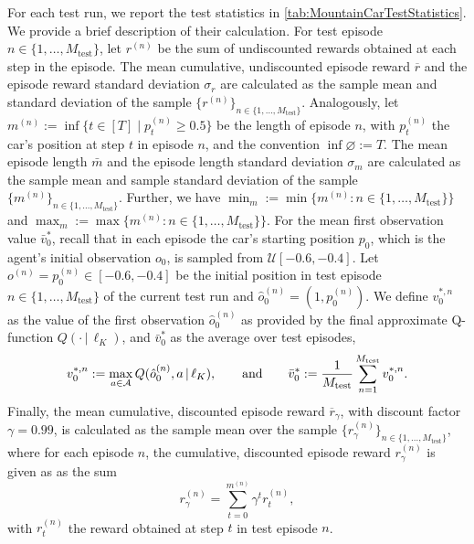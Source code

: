 \documentclass[
    a4paper,
    11pt,
    bibliography=totoc,
    listof=totoc,      
    headinclude=true,
    cleardoublepage=empty,
]{scrbook}
\theoremstyle{plain}
\theoremstyle{definition}
\theoremstyle{remark}
\newcommand{\SpaceA}{{\cal A}}
\begin{document}
For each test run, we report the test statistics in
\cref{tab:MountainCarTestStatistics}. We provide a brief description of their 
calculation. For test episode $n\in\{1,\dots,M_\text{test}\}$,
let $r^{(n)}$ be the sum of undiscounted rewards obtained at
each step in the episode. The mean cumulative, undiscounted episode reward 
$\overline{r}$ and the episode reward standard deviation $\sigma_r$ are calculated
as the sample mean and standard deviation of the sample $\{r^{(n)}\}_{n\in
\{1,\dots,M_\text{test}\}}$. Analogously, let $m^{(n)}:=\inf\{t\in[T]\mid p^{(n)}_{t} 
\geq 0.5\}$ be the length of episode $n$, with $p_t^{(n)}$ the car's position
at step $t$ in episode $n$, and the convention $\inf \varnothing := T$. The 
mean episode length $\bar{m}$ and the episode length standard deviation 
$\sigma_m$ are calculated as the sample mean and sample standard deviation of
the sample $\{m^{(n)}\}_{ n\in\{1,\dots,M_\text{test}\}}$. Further, we have 
$\min_m := \min\{m^{(n)} : n\in\{1,\dots,M_\text{test}\}\}$ and $\max_m := 
\max\{m^{(n)}: n\in\{1,\dots,M_\text{test}\}\}$. For the mean first observation 
value $\bar v^*_0$, recall that in each episode the car's starting position $p_0$,
which is the agent's initial observation $o_0$, is sampled from $\mathcal{U}
[-0.6, -0.4]$. Let $o^{(n)} = p_0^{(n)} \in [-0.6, -0.4]$ be the initial 
position in test episode $n\in\{1,\dots,M_\text{test}\}$ of the current test 
run and $\hat{o}^{(n)}_0 = (1,p^{(n)}_0)$. We define $v_0^{*,n}$ as the 
value of the first observation $\hat{o}^{(n)}_0$ as provided by the final 
approximate Q-function $Q(\cdot\,|\, \ell_K)$, and $\bar{v}_0^*$ as the 
average over test episodes,
\begin{equation}
\label{eq:MountainCarFirstObservationValue}
    v_0^{*,n} := \max_{a\in\SpaceA} Q(\hat{o}^{(n)}_0, a\,|\,\ell_K),
    \qquad \text{and} \qquad
    \bar v^*_0 := \frac{1}{M_\text{test}} \sum_{n=1}^{M_\text{test}} v_0^{*,n}.
\end{equation}
Finally, the mean cumulative, discounted episode reward $\overline{r}_\gamma$, 
with discount factor $\gamma=0.99$, is calculated as the sample mean over the 
sample $\{r_\gamma^{(n)}\}_{n\in\{1,\dots,M_\text{test}\}}$, 
where for each episode $n$, the cumulative, discounted episode reward 
$r_\gamma^{(n)}$ is given as as the sum
\begin{equation}
\label{eq:MountainCarDiscountedReward} 
    r_\gamma^{(n)} = \sum_{t=0}^{m^{(n)}} \gamma^t r_t^{(n)},
\end{equation}
with $r_t^{(n)}$ the reward obtained at step $t$ in test episode $n$.
\end{document}
